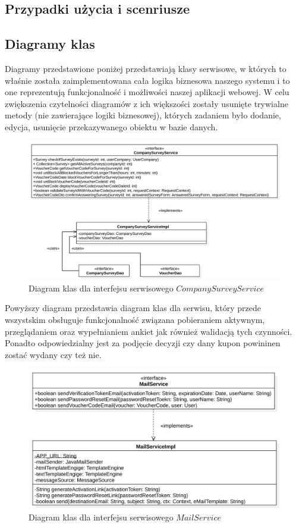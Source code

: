 \documentclass[a4paper]{article}
\begin{document}
\subsection{Przypadki użycia i scenriusze}
\subsection{Diagramy klas}
Diagramy przedstawione poniżej przedstawiają klasy serwisowe, w których to właśnie została zaimplementowana cała logika biznesowa naszego systemu  i to one reprezentują funkcjonalność i możliwości naszej aplikacji webowej. W celu zwiększenia czytelności diagramów z ich większości zostały usunięte trywialne metody (nie zawierające logiki biznesowej), których zadaniem było dodanie, edycja, usunięcie przekazywanego obiektu w bazie danych.
\begin{figure}[H]
  \centering
  \includegraphics[scale=0.6]{company_survey_service.pdf}
  \caption{Diagram klas dla interfejsu serwisowego $CompanySurveyService$}
\end{figure}
Powyższy diagram przedstawia diagram klas dla serwisu, który przede wszystskim obsługuje funkcjonalność związana pobieraniem aktywnym, przeglądaniem oraz wypełnianiem ankiet jak również walidacją tych czynności. Ponadto odpowiedzialny jest za podjęcie decyzji czy dany kupon powininen zostać wydany czy też nie.
\begin{figure}[H]
  \centering
  \includegraphics[scale=0.6]{mail_service.pdf}
  \caption{Diagram klas dla interfejsu serwisowego $MailService$}
\end{figure}
\end{document}

